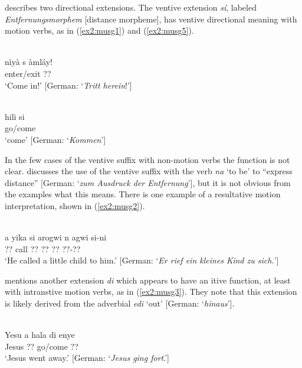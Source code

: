 \citet{meyer-bahlburgStudienZurMorphologie1972} describes two directional extensions. The ventive extension \textit{sí}, labeled \textit{Entfernungsmorphem} [distance morpheme], has ventive directional meaning with motion verbs, as in (\ref{ex2:musg1}) and (\ref{ex2:musg5}).

\ea\label{ex2:musg1}
 \\
\gll  nìyà s àmláy! \\
enter/exit  ?? \\
\glt `Come in!' [German: `\textit{Tritt herein}!']

\ex\label{ex2:musg5}
 \\
\gll hili si \\
go/come 	\\
\glt `come' [German: `\textit{Kommen}']
\z 

In the few cases of the ventive suffix with non-motion verbs the function is not clear. \citet[133]{meyer-bahlburgStudienZurMorphologie1972} discusses the use of the ventive suffix with the verb \textit{na} `to be' to ``express distance'' [German: `\textit{zum Ausdruck der Entfernung}'], but it is not obvious from the examples what this means. There is one example of a resultative motion interpretation, shown in (\ref{ex2:musg2}).

\ea\label{ex2:musg2}
 \\
\gll  a yika si arogwi n agwi si-ni	\\
?? call  ?? ?? ?? ??-?? \\
\glt `He called a little child to him.' [German: `\textit{Er rief ein kleines Kind zu sich.}']
\z 

\citet[133--134]{meyer-bahlburgStudienZurMorphologie1972} mentions another extension \textit{di} which appears to have an itive function, at least with intranstive motion verbs, as in (\ref{ex2:musg3}). They note that this extension is likely derived from the adverbial \textit{edi} `out' [German: `\textit{hinaus}'].

\ea\label{ex2:musg3}
 \\
\gll Yesu a hala di enye \\
Jesus ?? go/come  ?? \\
\glt `Jesus went away.' [German: `\textit{Jesus ging fort}.']
\z 

